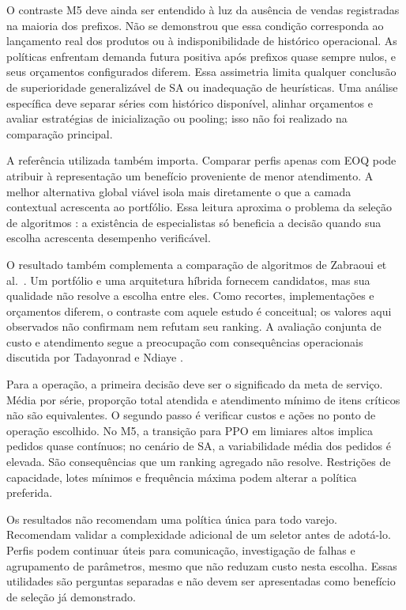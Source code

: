 \documentclass[preprint,12pt]{elsarticle}
\begin{document}
O contraste M5 deve ainda ser entendido à luz da ausência de vendas registradas na maioria dos prefixos. Não se demonstrou que essa condição corresponda ao lançamento real dos produtos ou à indisponibilidade de histórico operacional. As políticas enfrentam demanda futura positiva após prefixos quase sempre nulos, e seus orçamentos configurados diferem. Essa assimetria limita qualquer conclusão de superioridade generalizável de SA ou inadequação de heurísticas. Uma análise específica deve separar séries com histórico disponível, alinhar orçamentos e avaliar estratégias de inicialização ou pooling; isso não foi realizado na comparação principal.

A referência utilizada também importa. Comparar perfis apenas com EOQ pode atribuir à representação um benefício proveniente de menor atendimento. A melhor alternativa global viável isola mais diretamente o que a camada contextual acrescenta ao portfólio. Essa leitura aproxima o problema da seleção de algoritmos \cite{rice1976,Kotthoff2014AlgorithmSelection}: a existência de especialistas só beneficia a decisão quando sua escolha acrescenta desempenho verificável.

O resultado também complementa a comparação de algoritmos de Zabraoui et al.\ \cite{sca_27e994c54848}. Um portfólio e uma arquitetura híbrida fornecem candidatos, mas sua qualidade não resolve a escolha entre eles. Como recortes, implementações e orçamentos diferem, o contraste com aquele estudo é conceitual; os valores aqui observados não confirmam nem refutam seu ranking. A avaliação conjunta de custo e atendimento segue a preocupação com consequências operacionais discutida por Tadayonrad e Ndiaye \cite{sca_f81ad2b3e023}.

Para a operação, a primeira decisão deve ser o significado da meta de serviço. Média por série, proporção total atendida e atendimento mínimo de itens críticos não são equivalentes. O segundo passo é verificar custos e ações no ponto de operação escolhido. No M5, a transição para PPO em limiares altos implica pedidos quase contínuos; no cenário de SA, a variabilidade média dos pedidos é elevada. São consequências que um ranking agregado não resolve. Restrições de capacidade, lotes mínimos e frequência máxima podem alterar a política preferida.

Os resultados não recomendam uma política única para todo varejo. Recomendam validar a complexidade adicional de um seletor antes de adotá-lo. Perfis podem continuar úteis para comunicação, investigação de falhas e agrupamento de parâmetros, mesmo que não reduzam custo nesta escolha. Essas utilidades são perguntas separadas e não devem ser apresentadas como benefício de seleção já demonstrado.
\end{document}
